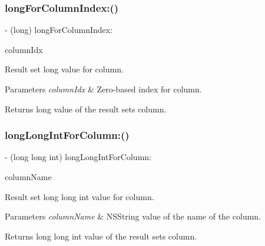 \subsubsection{\texorpdfstring{long\+For\+Column\+Index\+:()}{longForColumnIndex:()}}
{\footnotesize\ttfamily -\/ (long) long\+For\+Column\+Index\+: \begin{DoxyParamCaption}\item[{(int)}]{column\+Idx }\end{DoxyParamCaption}}

Result set long value for column.


\begin{DoxyParams}{Parameters}
{\em column\+Idx} & Zero-\/based index for column.\\
\hline
\end{DoxyParams}
\begin{DoxyReturn}{Returns}
{\ttfamily long} value of the result set\textquotesingle{}s column. 
\end{DoxyReturn}
\mbox{\label{interface_o_p_t_l_y_f_m_d_b_result_set_a7035cde8cd8ec3d38f40686e9f86b234}} 
\subsubsection{\texorpdfstring{long\+Long\+Int\+For\+Column\+:()}{longLongIntForColumn:()}}
{\footnotesize\ttfamily -\/ (long long int) long\+Long\+Int\+For\+Column\+: \begin{DoxyParamCaption}\item[{(N\+S\+String$\ast$)}]{column\+Name }\end{DoxyParamCaption}}

Result set {\ttfamily long long int} value for column.


\begin{DoxyParams}{Parameters}
{\em column\+Name} & {\ttfamily N\+S\+String} value of the name of the column.\\
\hline
\end{DoxyParams}
\begin{DoxyReturn}{Returns}
{\ttfamily long long int} value of the result set\textquotesingle{}s column. 
\end{DoxyReturn}
\mbox{\label{interface_o_p_t_l_y_f_m_d_b_result_set_ace4f1c69bc1d2c014bba100a44fdc4e9}} 
